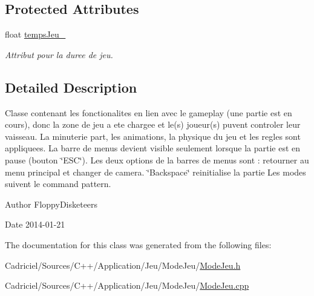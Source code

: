 \subsection*{Protected Attributes}
\begin{DoxyCompactItemize}
\item 
\hypertarget{group__inf2990_gab9c63901c8b14b0d0a11de3e76e686a0}{float \hyperlink{group__inf2990_gab9c63901c8b14b0d0a11de3e76e686a0}{temps\-Jeu\-\_\-}}\label{group__inf2990_gab9c63901c8b14b0d0a11de3e76e686a0}

\begin{DoxyCompactList}\small\item\em Attribut pour la duree de jeu. \end{DoxyCompactList}\end{DoxyCompactItemize}


\subsection{Detailed Description}
Classe contenant les fonctionalites en lien avec le gameplay (une partie est en cours), donc la zone de jeu a ete chargee et le(s) joueur(s) puvent controler leur vaisseau. La minuterie part, les animations, la physique du jeu et les regles sont appliquees. La barre de menus devient visible seulement lorsque la partie est en pause (bouton \char`\"{}\-E\-S\-C\char`\"{}). Les deux options de la barres de menus sont \-: retourner au menu principal et changer de camera. \char`\"{}\-Backspace\char`\"{} reinitialise la partie Les modes suivent le command pattern. 

\begin{DoxyAuthor}{Author}
Floppy\-Disketeers 
\end{DoxyAuthor}
\begin{DoxyDate}{Date}
2014-\/01-\/21 
\end{DoxyDate}


The documentation for this class was generated from the following files\-:\begin{DoxyCompactItemize}
\item 
Cadriciel/\-Sources/\-C++/\-Application/\-Jeu/\-Mode\-Jeu/\hyperlink{_mode_jeu_8h}{Mode\-Jeu.\-h}\item 
Cadriciel/\-Sources/\-C++/\-Application/\-Jeu/\-Mode\-Jeu/\hyperlink{_mode_jeu_8cpp}{Mode\-Jeu.\-cpp}\end{DoxyCompactItemize}
